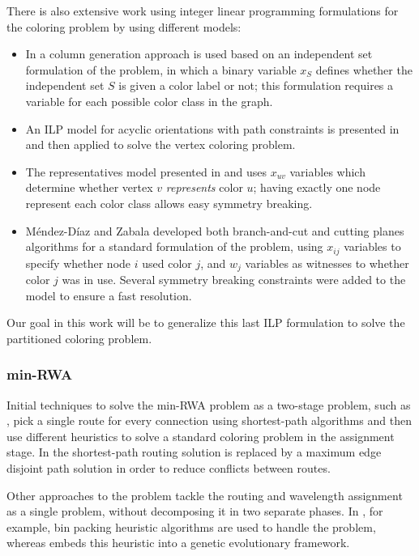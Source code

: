 There is also extensive work using integer linear programming formulations for the coloring problem by using different models:
\begin{itemize}
\item{In \cite{mehrotra1996column} a column generation approach is used based on an independent set formulation of the problem, in which a binary variable $x_S$ defines whether the independent set $S$ is given a color label or not; this formulation requires a variable for each possible color class in the graph.}
\item{An ILP model for acyclic orientations with path constraints is presented in \cite{figueiredo2005acyclic} and then applied to solve the vertex coloring problem.}
\item{The representatives model presented in \cite{campelo2004cliques} and \cite{campelo2008asymmetric} uses $x_{uv}$ variables which determine whether vertex $v$ \textit{represents} color $u$; having exactly one node represent each color class allows easy symmetry breaking.}
\item{M\'endez-D\'iaz and Zabala \cite{mendez2006branch,mendez2008cutting} developed both branch-and-cut and cutting planes algorithms for a standard formulation of the problem, using $x_{ij}$ variables to specify whether node $i$ used color $j$, and $w_j$ variables as witnesses to whether color $j$ was in use. Several symmetry breaking constraints were added to the model to ensure a fast resolution.}
\end{itemize}

Our goal in this work will be to generalize this last ILP formulation to solve the partitioned coloring problem.

\subsubsection{min-RWA}

Initial techniques to solve the min-RWA problem as a two-stage problem, such as \cite{hyytia14wavelength}, pick a single route for every connection using shortest-path algorithms and then use different heuristics to solve a standard coloring problem in the assignment stage. In \cite{manohar2002routing} the shortest-path routing solution is replaced by a maximum edge disjoint path solution in order to reduce conflicts between routes.

Other approaches to the problem tackle the routing and wavelength assignment as a single problem, without decomposing it in two separate phases. In \cite{skorin2007routing}, for example, bin packing heuristic algorithms are used to handle the problem, whereas \cite{noronha2007random} embeds this heuristic into a genetic evolutionary framework.

